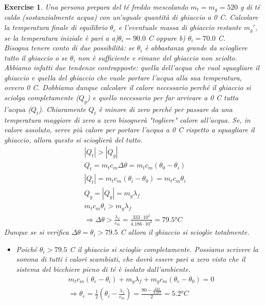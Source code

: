 \documentclass[10pt,a4paper]{article}
\newtheorem{exercise}{Exercise}
\begin{document}
\begin{exercise}
Una persona prepara del té freddo mescolando $m_t = m_g =520$ g di té caldo (sostanzialmente acqua) con un’uguale quantità di ghiaccio a 0 \textdegree C. Calcolare la temperatura finale di equilibrio $\theta_e$ e l’eventuale massa di ghiaccio restante $m_g'$, se la temperatura iniziale è pari a a)$\theta_i = 90.0$ \textdegree C oppure b) $\theta_i = 70.0$ \textdegree C.\\
Bisogna tenere conto di due possibilità: se $\theta_i$ è abbastanza grande da sciogliere tutto il ghiaccio o se $\theta_i$ non è sufficiente e rimane del ghiaccio non sciolto. Abbiamo infatti due tendenze contrapposte: quella dell'acqua che vuol squagliare il ghiaccio  e quella del ghiaccio che vuole portare l'acqua alla sua temperatura, ovvero 0 \textdegree C. Dobbiamo dunque calcolare il calore necessario perché il ghiaccio si sciolga completamente ($Q_g$) e quello necessario per far arrivare a 0 \textdegree C tutta l'acqua ($Q_t$). Chiaramente $Q_t$ è minore di zero perché per passare da una temperatura maggiore di zero a zero bisognerà "togliere" calore all'acqua. Se, in valore assoluto, serve più calore per portare l'acqua a 0 \textdegree C rispetto a squagliare il ghiaccio, allora questo si scioglierà del tutto. 
\begin{align*} 
	&|Q_t| > |Q_g|\\
	&Q_t = m_t c_m \Delta\theta = m_t c_m (\theta_0-\theta_i)\\
	&|Q_t| =  m_t c_m (\theta_i-\theta_0) = m_t c_m \theta_i\\
	&Q_g = |Q_g| = m_g \lambda_f\\
	&m_t c_m \theta_i >m_g \lambda_f\\
	&\Rightarrow \Delta\theta > \frac{\lambda_f}{c_m} = \frac{333 \cdot 10^3}{4.186 \cdot 10^3} = 79.5 °C
\end{align*} 
Dunque se si verifica $\Delta\theta = \theta_i >79.5$ \textdegree C allora il ghiaccio si scioglie totalmente.
\begin{itemize}
\item[a.] Poiché $\theta_i>79.5$ \textdegree C il ghiaccio si scioglie completamente. Possiamo scrivere la somma di tutti i calori scambiati, che dovrà essere pari a zero visto che il sistema del bicchiere pieno di té è isolato dall'ambiente. 
\begin{align*} 
	&m_t c_m (\theta_e-\theta_i) + m_g \lambda_f + m_g c_m (\theta_e-\theta_0)= 0\\
	&\Rightarrow \theta_e = \frac{1}{2}\left(\theta_i-\frac{\lambda_f}{c_m}\right) = \frac{90-\frac{333}{4.187}}{2} = 5.2 °C\\

\end{align*}
\end{itemize}
\end{exercise}
\end{document}
